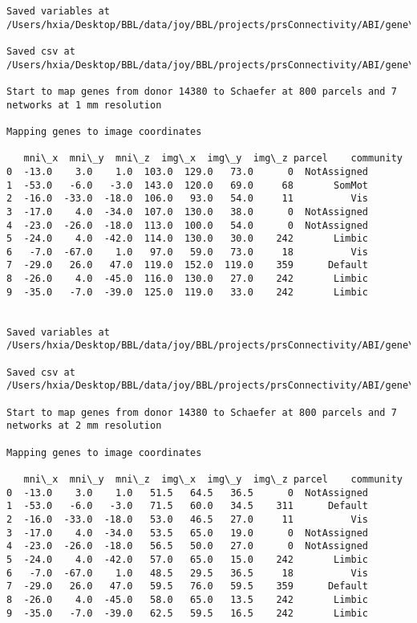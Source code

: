 \documentclass[11pt]{article}
\begin{document}
\begin{Verbatim}[commandchars=\\\{\}]
Saved variables at /Users/hxia/Desktop/BBL/data/joy/BBL/projects/prsConnectivity/ABI/gene\_mapping/14380donor\_600Parcels\_17Network\_2mm.pkl

Saved csv at /Users/hxia/Desktop/BBL/data/joy/BBL/projects/prsConnectivity/ABI/gene\_mapping/14380donor\_600Parcels\_17Network\_2mm.csv

Start to map genes from donor 14380 to Schaefer at 800 parcels and 7 networks at 1 mm resolution

Mapping genes to image coordinates

   mni\_x  mni\_y  mni\_z  img\_x  img\_y  img\_z parcel    community
0  -13.0    3.0    1.0  103.0  129.0   73.0      0  NotAssigned
1  -53.0   -6.0   -3.0  143.0  120.0   69.0     68       SomMot
2  -16.0  -33.0  -18.0  106.0   93.0   54.0     11          Vis
3  -17.0    4.0  -34.0  107.0  130.0   38.0      0  NotAssigned
4  -23.0  -26.0  -18.0  113.0  100.0   54.0      0  NotAssigned
5  -24.0    4.0  -42.0  114.0  130.0   30.0    242       Limbic
6   -7.0  -67.0    1.0   97.0   59.0   73.0     18          Vis
7  -29.0   26.0   47.0  119.0  152.0  119.0    359      Default
8  -26.0    4.0  -45.0  116.0  130.0   27.0    242       Limbic
9  -35.0   -7.0  -39.0  125.0  119.0   33.0    242       Limbic


Saved variables at /Users/hxia/Desktop/BBL/data/joy/BBL/projects/prsConnectivity/ABI/gene\_mapping/14380donor\_800Parcels\_7Network\_1mm.pkl

Saved csv at /Users/hxia/Desktop/BBL/data/joy/BBL/projects/prsConnectivity/ABI/gene\_mapping/14380donor\_800Parcels\_7Network\_1mm.csv

Start to map genes from donor 14380 to Schaefer at 800 parcels and 7 networks at 2 mm resolution

Mapping genes to image coordinates

   mni\_x  mni\_y  mni\_z  img\_x  img\_y  img\_z parcel    community
0  -13.0    3.0    1.0   51.5   64.5   36.5      0  NotAssigned
1  -53.0   -6.0   -3.0   71.5   60.0   34.5    311      Default
2  -16.0  -33.0  -18.0   53.0   46.5   27.0     11          Vis
3  -17.0    4.0  -34.0   53.5   65.0   19.0      0  NotAssigned
4  -23.0  -26.0  -18.0   56.5   50.0   27.0      0  NotAssigned
5  -24.0    4.0  -42.0   57.0   65.0   15.0    242       Limbic
6   -7.0  -67.0    1.0   48.5   29.5   36.5     18          Vis
7  -29.0   26.0   47.0   59.5   76.0   59.5    359      Default
8  -26.0    4.0  -45.0   58.0   65.0   13.5    242       Limbic
9  -35.0   -7.0  -39.0   62.5   59.5   16.5    242       Limbic



\end{Verbatim}
\end{document}
